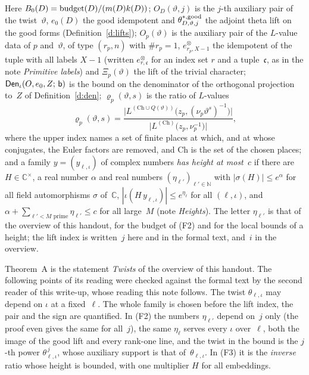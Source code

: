 \documentclass[11pt,a4paper]{article}
\newcommand{\m}[1]{\mbox{$#1$}}        %
\theoremstyle{plainx}
\theoremstyle{uprightx}
\newcommand{\CC}{\mathbb{C}}
\newcommand{\NN}{\mathbb{N}}
\newcommand{\Dm}[1]{m(#1)}
\newcommand{\kD}[1]{k(#1)}
\newcommand{\tupleIdem}[2]{e^{\otimes}_{#1,#2}}   %
\begin{document}
Here \m{\Bzero{D}=\operatorname{budget}(D)/(\Dm{D}\kD{D})}; \m{O_D(\vartheta,j)} is the $j$-th auxiliary pair of
the twist~$\vartheta$, \m{e_0(D)} the good idempotent and \m{\goodLift{D}{\vartheta}{j}} the adjoint theta lift on the
good forms (Definition~\ref{d:lifts}); \m{O_p(\vartheta)} is the auxiliary pair of the $L$-value data of $p$
and~$\vartheta$, of type \m{(r_p,n)} with \m{\#r_p=1}, \m{\tupleIdem{r_p}{X-1}} the idempotent of the tuple with all
labels \m{X-1} (written \m{\tupleIdem{r}{\mathfrak{c}}} for an index set $r$ and a tuple~$\mathfrak{c}$, as in the note \emph{Primitive
labels}) and \m{\Xi_p(\vartheta)} the lift of the trivial character; \m{\DenominatorLe{\iota}{O}{e_0}{Z}{\mathsf{b}}} is the bound on the denominator of the orthogonal projection
to~$Z$ of Definition~\ref{d:den}; \m{\varrho_p(\vartheta,s)} is the ratio of $L$-values
\[
\varrho_p(\vartheta,s)=\frac{\bigl|L^{(\mathrm{Ch}\cup Q(\vartheta))}\bigl(z_p,(\nu_p\vartheta^{s})^{-1}\bigr)\bigr|}{\bigl|L^{(\mathrm{Ch})}\bigl(z_p,\nu_p^{-1}\bigr)\bigr|},
\]
where the upper index names a set of finite places at which, and at whose conjugates, the Euler factors are
removed, and \m{\mathrm{Ch}} is the set of the chosen places; and a family \m{y=(y_{\ell,\iota})} of complex numbers
\emph{has height at most~$c$} if there are \m{H\in\CC^{\times}}, a real number $\alpha$ and real numbers
\m{(\eta_{\ell'})_{\ell'\in\NN}} with \m{|\sigma(H)|\le e^{\alpha}} for all field automorphisms $\sigma$ of~$\CC$,
\m{|\iota(H\,y_{\ell,\iota})|\le e^{\eta_\ell}} for all \m{(\ell,\iota)}, and \m{\alpha+\sum_{\ell'<M\text{ prime}}\eta_{\ell'}\le c} for
all large~$M$ (note \emph{Heights}). The letter \m{\eta_{\ell'}} is that of the overview of this handout, for the
budget of (F2) and for the local bounds of a height; the lift index is written~$j$ here and in the formal text,
and~$i$ in the overview.

Theorem~A is the statement \emph{Twists} of the overview of this handout. The following points of its reading
were checked against the formal text by the second reader of this write-up, whose reading this note follows.
The twist \m{\theta_{\ell,\iota}} may depend on $\iota$ at a fixed~$\ell$. The whole family is chosen before the lift index,
the pair and the sign are quantified. In (F2) the numbers \m{\eta_{\ell'}} depend on~$j$ only (the proof even gives the
same for all~$j$), the same \m{\eta_\ell} serves every $\iota$ over~$\ell$, both the image of the good lift and
every rank-one line, and the twist in the bound is the $j$-th power \m{\theta_{\ell,\iota}^{\,j}}, whose auxiliary support
is that of~\m{\theta_{\ell,\iota}}. In (F3) it is the \emph{inverse} ratio whose height is bounded, with one multiplier
$H$ for all embeddings.
\end{document}
